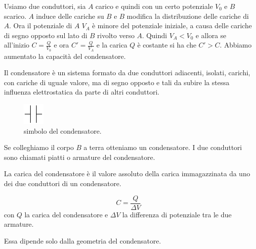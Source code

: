 Usiamo due conduttori, sia $A$ carico e quindi con un certo potenziale $V_0$ e $B$ scarico. $A$ induce delle cariche su $B$ e $B$ modifica la distribuzione delle cariche di $A$. Ora il potenziale di $A$ $V_A$ è minore del potenziale iniziale, a causa delle cariche di segno opposto sul lato di $B$ rivolto verso $A$. Quindi $V_A<V_0$ e allora se all'inizio $C=\frac{Q}{V_0}$ e ora $C'=\frac{Q}{V_A}$ e la carica $Q$ è costante si ha che $C'>C$. Abbiamo aumentato la capacità del condensatore.
\begin{Def}[condensatore]
Il condensatore è un sistema formato da due conduttori adiacenti, isolati, carichi, con cariche di uguale valore, ma di segno opposto e tali da subire la stessa influenza elettrostatica da parte di altri conduttori.
\end{Def}
\begin{figure}[htbp]
\centering
\includegraphics[scale=1.5]{immagini/fisica2/cond1}
\caption{simbolo del condensatore.}
\end{figure}
Se colleghiamo il corpo $B$ a terra otteniamo un condensatore. I due conduttori sono chiamati piatti o armature del condensatore.
\begin{Def}
La carica del condensatore è il valore assoluto della carica immagazzinata da uno dei due conduttori di un condensatore.
\end{Def}
\begin{Def}
\[C=\frac{Q}{\Delta V}\]
con $Q$ la carica del condensatore e $\Delta V$ la differenza di potenziale tra le due armature.
\end{Def}
Essa dipende solo dalla geometria del condensatore.
